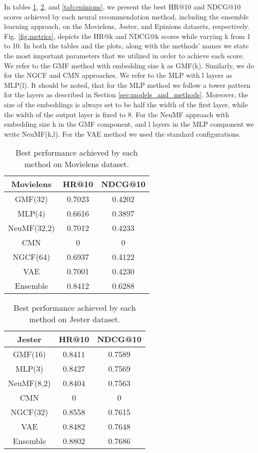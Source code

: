 In tables \ref{tab:movielens}, \ref{tab:jester}, and \ref{tab:epinions}, we present the best HR@10 and NDCG@10 scores achieved by each neural recommendation method, including the ensemble learning approach, on the Movielens, Jester, and Epinions datasets, respectively.
Fig. \ref{fig:metrics}, depicts the HR@k and NDCG@k scores while varying k from 1 to 10.
In both the tables and the plots, along with the methods' names we state the most important parameters that we utilized in order to achieve each score.
We refer to the GMF method with embedding size k as GMF(k).
Similarly, we do for the NGCF and CMN approaches.
We refer to the MLP with l layers as MLP(l).
It should be noted, that for the MLP method we follow a tower pattern for the layers as described in Section \ref{sec:models_and_methods}.
Moreover, the size of the embeddings is always set to be half the width of the first layer, while the width of the output layer is fixed to 8.
For the NeuMF approach with embedding size k in the GMF component, and l layers in the MLP component we write NeuMF(k,l).
For the VAE method we used the standard configurations.

\begin{table}[h]
    \centering
    \begin{tabular}{c|c|c}
        \hline
        Movielens & HR@10  & NDCG@10 \\
        \hline
        GMF(32)     & 0.7023 & 0.4202  \\
        MLP(4)      & 0.6616 & 0.3897 \\
        NeuMF(32,2) & 0.7012 & 0.4233 \\
        CMN         & 0 & 0 \\
        NGCF(64)    & 0.6937 & 0.4122 \\
        VAE         & 0.7001 & 0.4230 \\
        Ensemble    & 0.8412 & 0.6288
    \end{tabular}
    \caption{Best performance achieved by each method on Movielens dataset.}
    \label{tab:movielens}
\end{table}

\begin{table}[h]
    \centering
    \begin{tabular}{c|c|c}
        \hline
        Jester & HR@10 & NDCG@10 \\
        \hline
        GMF(16)    & 0.8411 & 0.7589 \\
        MLP(3)     & 0.8427 & 0.7569 \\
        NeuMF(8,2) & 0.8404 & 0.7563 \\
        CMN        & 0 & 0 \\
        NGCF(32)   & 0.8558	& 0.7615 \\
        VAE        & 0.8482 & 0.7648 \\
        Ensemble   & 0.8802 & 0.7686
    \end{tabular}
    \caption{Best performance achieved by each method on Jester dataset.}
    \label{tab:jester}
\end{table}

